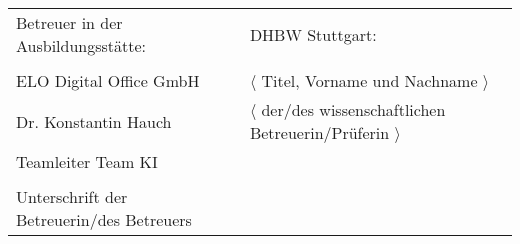 \begin{spacing}{1}
  \vfill

  \begin{tabular}{ll}
    Betreuer in der Ausbildungsstätte:        & DHBW Stuttgart:                                                    \\
    \hspace{0.4\linewidth}                    &                                                                    \\
    ELO Digital Office GmbH & $\langle$ Titel, Vorname und Nachname $\rangle$                    \\
    Dr. Konstantin Hauch
                                              & $\langle$ der/des wissenschaftlichen Betreuerin/Prüferin $\rangle$ \\
    Teamleiter Team KI                                                     \\
    \\
    Unterschrift der Betreuerin/des Betreuers                                                                      \\
  \end{tabular}


  \vspace{1cm}
\end{spacing}



